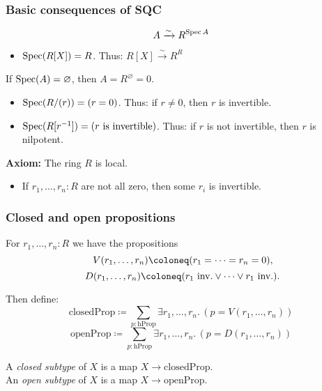\documentclass{beamer}
\begin{document}
\begin{frame}
  \frametitle{Basic consequences of SQC}

  \[ A \xrightarrow{\sim} R^{\operatorname{Spec} A}\]

  \vspace{5mm}
  \begin{itemize}
    \item
      $\operatorname{Spec}(R[X]) = R$.
      Thus:
      $R[X] \xrightarrow{\sim} R^R$
  \end{itemize}

  \pause
  \vspace{5mm}
  If $\operatorname{Spec}(A) = \varnothing$,
  then $A = R^\varnothing = 0$.

  \vspace{2.5mm}
  \begin{itemize}
    \item
      $\operatorname{Spec}(R/(r)) = (r = 0)$.
      Thus:
      if $r \neq 0$,
      then $r$ is invertible.
    \item
      $\operatorname{Spec}(R[r^{-1}]) = (\text{$r$ is invertible})$.
      Thus:
      if $r$ is not invertible,
      then $r$ is nilpotent.
  \end{itemize}

  \pause
  \vspace{5mm}
  \textbf{Axiom:} The ring $R$ is local.

  \vspace{2.5mm}
  \begin{itemize}
    \item
      If $r_1, \dots, r_n : R$ are not all zero,
      then some $r_i$ is invertible.
  \end{itemize}
\end{frame}

\begin{frame}
  \frametitle{Closed and open propositions}

  For $r_1, \dots, r_n : R$ we have the propositions
  \[ V(r_1, \dots, r_n) \coloneq (r_1 = \dots = r_n = 0) \rlap{,}\]
  \[ D(r_1, \dots, r_n) \coloneq (\text{$r_1$ inv.} \lor \dots \lor \text{$r_1$ inv.}) \rlap{.}\]

  Then define:
  \[ \mathrm{closedProp} \coloneq
     \sum_{p : \mathrm{hProp}} \exists r_1, \dots, r_n.\, (p = V(r_1, \dots, r_n))
  \]
  \[ \mathrm{openProp} \coloneq
     \sum_{p : \mathrm{hProp}} \exists r_1, \dots, r_n.\, (p = D(r_1, \dots, r_n))
  \]

  \vspace{5mm}
  A \emph{closed subtype} of $X$
  is a map $X \to \mathrm{closedProp}$.\\
  An \emph{open subtype} of $X$
  is a map $X \to \mathrm{openProp}$.
\end{frame}
\end{document}
